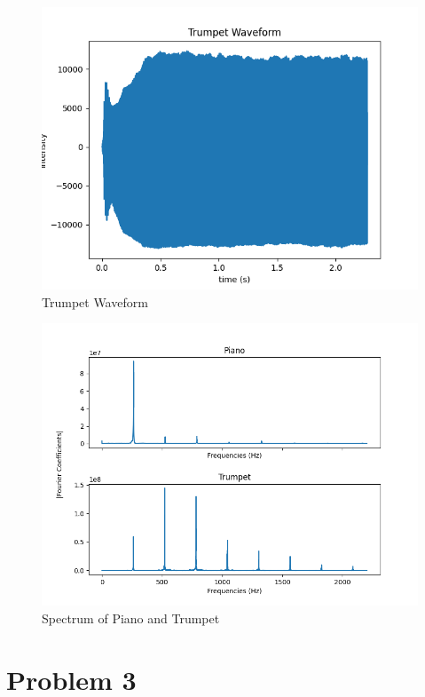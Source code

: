\documentclass{article}
\begin{document}
 \begin{figure}
     \centering
     \includegraphics[width=\linewidth]{trumpet.png}
     \caption{Trumpet Waveform}
     \label{fig:enter-label}
 \end{figure}

\begin{figure}
    \centering
    \includegraphics[width=\linewidth]{problem2.png}
    \caption{Spectrum of Piano and Trumpet}
    \label{fig:enter-label}
\end{figure}
\section{Problem 3}
\end{document}
